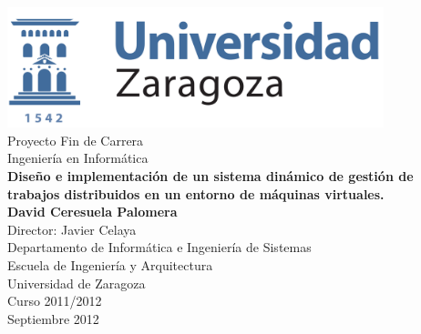 \documentclass[11pt, twoside]{book}
\makeatletter
\def\cleardoublepageempty{\clearpage\if@twoside \ifodd\c@page\else
    \hbox{}
    \thispagestyle{empty}
    \newpage
    \if@twocolumn\hbox{}\newpage\fi\fi\fi}
\def\bibname{Bibliografía}
\def\listtablename{Índice de tablas}
\makeatother
\begin{document}

\renewcommand{\listtablename}{Índice de tablas}
\renewcommand{\bibname}{Bibliografía}

\begin{titlepage} 
\begin{center} 
 
\includegraphics*[height=3.5cm]{imagenes/logo.png}\\ 

\vspace*{1.5cm} 
{\large Proyecto Fin de Carrera}\\ 
\vspace*{0.2cm} 
{\large Ingeniería en Informática}\\ 
\vspace*{1.5cm} 
{\huge \textbf{Diseño e implementación de un sistema dinámico de gestión de trabajos distribuidos en un entorno de máquinas virtuales.\\}}
\vspace*{2cm} 
{\Large \textbf{David Ceresuela Palomera\\}}
\vspace*{2cm} 
{\normalsize Director: Javier Celaya}\\ 
\vspace*{1.5cm} 
{\normalsize Departamento de Informática e Ingeniería de Sistemas}\\ 
{Escuela de Ingeniería y Arquitectura}\\ 
{Universidad de Zaragoza}\\ 
\vspace*{3.5cm} 
{\normalsize Curso 2011/2012}\\ 
{\normalsize Septiembre 2012}\\ 
\end{center} 
\end{titlepage} 

\cleardoublepageempty


\end{document}
